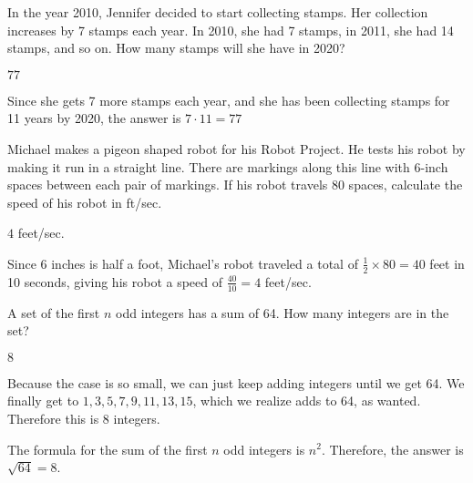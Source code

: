 \documentclass[11pt]{article}
\begin{document}
\begin{problem} %
In the year 2010, Jennifer decided to start collecting stamps. Her collection increases by 7 stamps each year. In 2010, she had 7 stamps, in 2011, she had 14 stamps, and so on. How many stamps will she have in 2020?
\end{problem}
\begin{answer}
$\boxed{77}$
\end{answer}
\begin{solution}
Since she gets 7 more stamps each year, and she has been collecting stamps for 11 years by 2020, the answer is $7 \cdot 11 = \boxed{77}$
\end{solution}

\begin{problem} %
Michael makes a pigeon shaped robot for his Robot Project. He tests his robot by making it run in a straight line. There are markings along this line with 6-inch spaces between each pair of markings. If his robot travels 80 spaces, calculate the speed of his robot in ft/sec.
\end{problem}
\begin{answer}
$\boxed{4}$ feet/sec.
\end{answer}
\begin{solution} Since 6 inches is half a foot, Michael's robot traveled a total of $\frac{1}{2} \times 80 = 40$ feet in 10 seconds, giving his robot a speed of $\frac{40}{10} = \boxed{4}$ feet/sec.
\end{solution}

\begin{problem} %
A set of the first $n$ odd integers has a sum of 64. How many integers are in the set?
\end{problem}
\begin{answer}
$\boxed{8}$
\end{answer}
\begin{solutionone}
Because the case is so small, we can just keep adding integers until we get 64. We finally get to $1,3,5,7,9,11,13,15$, which we realize adds to 64, as wanted. Therefore this is $\boxed{8}$ integers.
\end{solutionone}
\begin{solutiontwo}
The formula for the sum of the first $n$ odd integers is $n^2$. Therefore, the answer is $\sqrt{64} = \boxed{8}$.
\end{solutiontwo}
\end{document}
